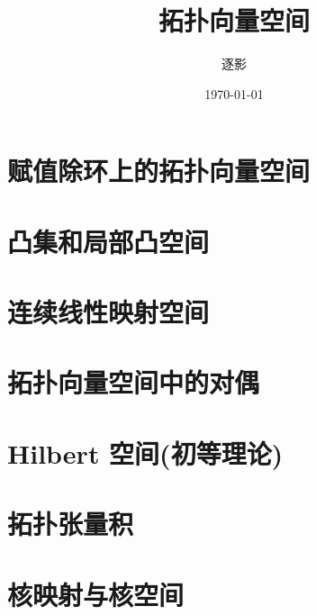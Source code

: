 \documentclass[UTF8,10pt, a4paper, oneside,scheme=plain]{ctexbook}
\author{逐影}
\title{\Huge\textbf{拓扑向量空间}}
\date{\today}
\begin{document}
\frontmatter
\maketitle
\tableofcontents
\mainmatter

\part{赋值除环上的拓扑向量空间}


\part{凸集和局部凸空间}


\part{连续线性映射空间}


\part{拓扑向量空间中的对偶}


\part{Hilbert 空间(初等理论)}


\part{拓扑张量积}


\part{核映射与核空间}


\backmatter
\end{document}
